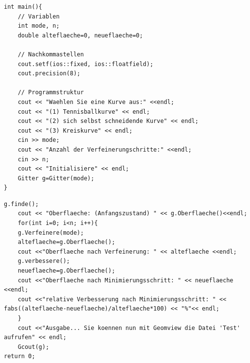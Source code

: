 \documentclass{beamer}
\begin{document}
\begin{frame}[fragile]

\begin{lstlisting}
int main(){
	// Variablen
	int mode, n;
	double alteflaeche=0, neueflaeche=0;
	
	// Nachkommastellen
	cout.setf(ios::fixed, ios::floatfield);
	cout.precision(8);
	
	// Programmstruktur
	cout << "Waehlen Sie eine Kurve aus:" <<endl;
	cout << "(1) Tennisballkurve" << endl;
	cout << "(2) sich selbst schneidende Kurve" << endl;
	cout << "(3) Kreiskurve" << endl;
	cin >> mode;
	cout << "Anzahl der Verfeinerungschritte:" <<endl;
	cin >> n;
	cout << "Initialisiere" << endl;
	Gitter g=Gitter(mode);
}
\end{lstlisting}
\end{frame}
\begin{frame}[fragile]
\begin{lstlisting}
g.finde();
	cout << "Oberflaeche: (Anfangszustand) " << g.Oberflaeche()<<endl;
	for(int i=0; i<n; i++){
	g.Verfeinere(mode);
	alteflaeche=g.Oberflaeche();
	cout <<"Oberflaeche nach Verfeinerung: " << alteflaeche <<endl;
	g.verbessere();
	neueflaeche=g.Oberflaeche();
	cout <<"Oberflaeche nach Minimierungsschritt: " << neueflaeche <<endl;
	cout <<"relative Verbesserung nach Minimierungsschritt: " <<  fabs((alteflaeche-neueflaeche)/alteflaeche*100) << "%"<< endl;
	}
	cout <<"Ausgabe... Sie koennen nun mit Geomview die Datei 'Test' aufrufen" << endl;
	Gcout(g);
return 0;
\end{lstlisting}
\end{frame}
\end{document}
